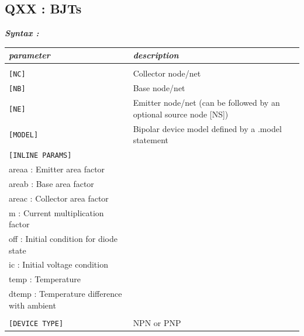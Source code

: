\newpage
\subsection{QXX : BJTs}
\label{subsec_sceadm_bjts}

\textbf{\textit{Syntax :}}


\begin{longtable}{l l}
\textit{parameter} & \textit{description} \\ \hline \\ \vspace{-0.8\parskip}
\texttt{[NC]} & Collector node/net \\
\texttt{[NB]} & Base node/net \\
\texttt{[NE]} & Emitter node/net (can be followed by an optional source node [NS]) \\
\texttt{[MODEL]} & Bipolar device model defined by a .model statement \\
\texttt{[INLINE PARAMS]} & \begin{tabular}{lp{5.5cm}p{5cm}}\textit{Inline parameters :} \\ 
																					{\small areaa : Emitter area factor} \\ 
																					{\small areab : Base area factor} \\ 
																					{\small areac : Collector area factor} \\ 
																					{\small m : Current multiplication factor} \\ 
																					{\small off : Initial condition for diode state} \\
																					{\small ic :  Initial voltage condition} \\
																					{\small temp : Temperature} \\
																					{\small dtemp : Temperature difference with ambient} \\
																					\end{tabular} \\
\texttt{[DEVICE TYPE]} & NPN or PNP \\																					
\end{longtable}

